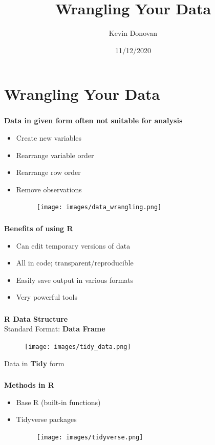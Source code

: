 \documentclass[xcolor=dvipsnames]{beamer}
\title[Data Management]{Wrangling Your Data}
\author[Kevin Donovan]{Kevin Donovan}
\institute[UNC and IBIS]{UNC-Chapel Hill and IBIS Network}
\date[11/12/2020]{11/12/2020}
\begin{document}
\begin{frame}
	\titlepage
\end{frame}

\section{Wrangling Your Data}
\begin{frame}
\frametitle{\insertsectionhead}
\textbf{Data in given form often not suitable for analysis}
\begin{itemize}
\item Create new variables
\item Rearrange variable order
\item Rearrange row order
\item Remove observations
\begin{figure}
\texttt{[image: images/data\_wrangling.png]}
\end{figure}
\end{itemize}
\end{frame}

\begin{frame}
\frametitle{\insertsectionhead}
\textbf{Benefits of using R}
\begin{itemize}
\item Can edit temporary versions of data
\item All in code; transparent/reproducible
\item Easily save output in various formats
\item Very powerful tools
\end{itemize}
\end{frame}

\begin{frame}
\frametitle{\insertsectionhead}
\textbf{R Data Structure}\\
Standard Format: \textbf{Data Frame}
\begin{figure}
\texttt{[image: images/tidy\_data.png]}
\end{figure}
Data in \textbf{Tidy} form
\end{frame}

\begin{frame}
\frametitle{\insertsectionhead}
\textbf{Methods in R}\\
\begin{itemize}
\item Base R (built-in functions)
\item Tidyverse packages
\begin{figure}
\texttt{[image: images/tidyverse.png]}
\end{figure}
\end{itemize}
\end{frame}
\end{document}
